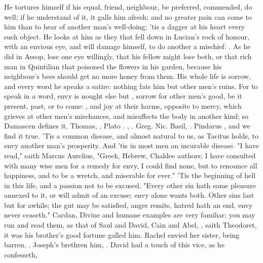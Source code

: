 He tortures himself if his equal, friend, neighbour, be preferred, commended,
do well; if he understand of it, it galls him afresh; and no greater pain can
come to him than to hear of another man's well-doing; 'tis a dagger at his
heart every such object. He looks at him as they that fell down in Lucian's
rock of honour, with an envious eye, and will damage himself, to do another a
mischief: . As he did in Aesop,
lose one eye willingly, that his fellow might lose both, or that rich man in
Quintilian that poisoned the flowers in his garden,
because his neighbour's bees should get no more honey from them. His whole life
is sorrow, and every word he speaks a satire: nothing fats him but other men's
ruins. For to speak in a word, envy is nought else but , sorrow for other men's good, be it present, past, or to come: , and joy at their harms, opposite to
mercy, which grieves at other men's mischances, and
misaffects the body in another kind; so Damascen defines it,
 Thomas,  \Aristotle{},  Plato . \Tully{}, . Greg. Nic.  Basil,
. Pindarus , and we find it true. 'Tis a common disease, and almost natural to us, as
Tacitus holds, to envy another man's prosperity. And 'tis
in most men an incurable disease. "I have read," saith
Marcus Aurelius, "Greek, Hebrew, Chaldee authors; I have consulted with many
wise men for a remedy for envy, I could find none, but to renounce all
happiness, and to be a wretch, and miserable for ever." 'Tis the beginning of
hell in this life, and a passion not to be excused. "Every
other sin hath some pleasure annexed to it, or will admit of an excuse; envy
alone wants both. Other sins last but for awhile; the gut may be satisfied,
anger remits, hatred hath an end, envy never ceaseth." Cardan,
 Divine and humane examples are very
familiar; you may run and read them, as that of Saul and David, Cain and Abel,
, saith
Theodoret, it was his brother's good fortune galled him. Rachel envied her
sister, being barren, . Joseph's brethren him, . David had a touch of this vice, as he confesseth,
